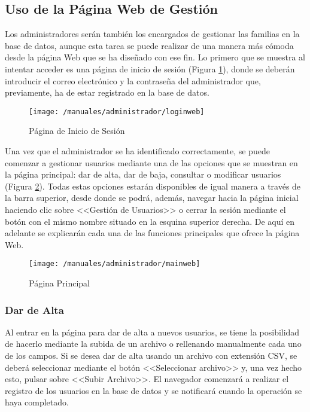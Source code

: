 \clearpage

\subsection*{Uso de la Página Web de Gestión}
Los administradores serán también los encargados de gestionar las familias en la base de datos, aunque esta tarea se puede realizar de una manera más cómoda desde la página Web que se ha diseñado con ese fin. Lo primero que se muestra al intentar acceder es una página de inicio de sesión (Figura \ref{fig:loginweb}), donde se deberán introducir el correo electrónico y la contraseña del administrador que, previamente, ha de estar registrado en la base de datos.

\begin{figure}[!h]
	\begin{center}
		\texttt{[image: /manuales/administrador/loginweb]}
		\caption{Página de Inicio de Sesión}
		\label{fig:loginweb}
	\end{center}
\end{figure}

Una vez que el administrador se ha identificado correctamente, se puede comenzar a gestionar usuarios mediante una de las opciones que se muestran en la página principal: dar de alta, dar de baja, consultar o modificar usuarios (Figura \ref{fig:indexweb}). Todas estas opciones estarán disponibles de igual manera a través de la barra superior, desde donde se podrá, además, navegar hacia la página inicial haciendo clic sobre <<Gestión de Usuarios>> o cerrar la sesión mediante el botón con el mismo nombre situado en la esquina superior derecha. De aquí en adelante se explicarán cada una de las funciones principales que ofrece la página Web.

\begin{figure}[!h]
	\begin{center}
		\texttt{[image: /manuales/administrador/mainweb]}
		\caption{Página Principal}
		\label{fig:indexweb}
	\end{center}
\end{figure}

\clearpage

\subsubsection*{Dar de Alta}
Al entrar en la página para dar de alta a nuevos usuarios, se tiene la posibilidad de hacerlo mediante la subida de un archivo o rellenando manualmente cada uno de los campos. Si se desea dar de alta usando un archivo con extensión \acs{CSV}, se deberá seleccionar mediante el botón <<Seleccionar archivo>> y, una vez hecho esto, pulsar sobre <<Subir Archivo>>. El navegador comenzará a realizar el registro de los usuarios en la base de datos y se notificará cuando la operación se haya completado.

